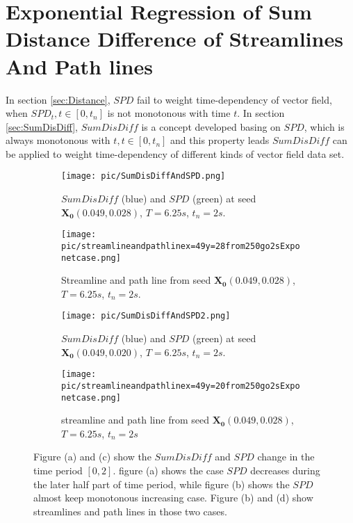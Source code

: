 \documentclass[
     11pt,         %
     a4paper,      %
     oneside,
     ]{article}
\newcommand{\vect}[1]{\boldsymbol{#1}}
\begin{document}
\section{Exponential Regression of Sum Distance Difference of Streamlines And Path lines}\label{sec:Exponent}
In section \ref{sec:Distance}, $SPD$ fail to weight time-dependency of vector field, when $SPD_{t}, t\in[0,t_{n}]$ is not monotonous with time $t$. In section \ref{sec:SumDisDiff}, $SumDisDiff$ is a concept developed basing on $SPD$, which is always monotonous  with $t, t\in[0,t_{n}]$ and this property leads $SumDisDiff$ can be applied to weight time-dependency of different kinds of vector field data set.\\
\begin{figure}[H]
	\centering
	\begin{subfigure}{0.45\textwidth}
		\centering
		\texttt{[image: pic/SumDisDiffAndSPD.png]}
		\caption{ $SumDisDiff$ (blue) and $SPD$ (green) at seed $\vect{X_{0}}(0.049, 0.028)$, $T=6.25s$, $t_{n}=2s$.}
	\end{subfigure}
	\begin{subfigure}{0.45\textwidth}
		\centering
		\texttt{[image: pic/streamlineandpathlinex=49y=28from250go2sExponetcase.png]}
		\caption{ Streamline and path line from seed $\vect{X_{0}}(0.049, 0.028)$, $T=6.25s$, $t_{n}=2s$.}
	\end{subfigure}
	\begin{subfigure}{0.45\textwidth}
		\centering
		\texttt{[image: pic/SumDisDiffAndSPD2.png]}
		\caption{ $SumDisDiff$ (blue) and $SPD$ (green) at seed $\vect{X_{0}}(0.049, 0.020)$, $T=6.25s$, $t_{n}=2s$.}
	\end{subfigure}
	\begin{subfigure}{0.45\textwidth}
		\centering
		\texttt{[image: pic/streamlineandpathlinex=49y=20from250go2sExponetcase.png]}
		\caption{ streamline and path line from seed $\vect{X_{0}}(0.049, 0.028)$, $T=6.25s$, $t_{n}=2s$}
	\end{subfigure}
	
	\caption{Figure (a) and (c) show the $SumDisDiff$ and $SPD$ change in the time period $[0,2]$. figure (a) shows the case $SPD$ decreases during the later half part of time period, while figure (b) shows the $SPD$ almost keep monotonous increasing case. Figure (b) and (d) show streamlines and path lines in those two cases.}
	\label{fig:SPDandSumDisDiffCompare}
\end{figure}
\end{document}
